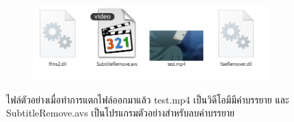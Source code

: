 \begin{figure}[H]
    \centering
    \begin{subfigure}{0.8\linewidth}
        \centering
        \includegraphics[width=1\linewidth]{image/demo_anime/file.png}
    \end{subfigure}
    \caption{ไฟล์ตัวอย่างเมื่อทำการแตกไฟล์ออกมาแล้ว test.mp4 เป็นวิดีโอมีมีคำบรรยาย และ SubtitleRemove.avs เป็นโปรแกรมตัวอย่างสำหรับลบคำบรรยาย}
\end{figure}